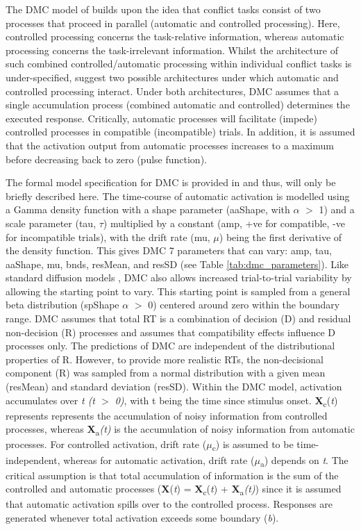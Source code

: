The DMC model of \textcite{ulrich2015automatic} builds upon the idea that
conflict tasks consist of two processes that proceed in parallel (automatic and
controlled processing). Here, controlled processing concerns the task-relative
information, whereas automatic processing concerns the task-irrelevant
information. Whilst the architecture of such combined controlled/automatic
processing within individual conflict tasks is under-specified,
\textcite{ulrich2015automatic} suggest two possible architectures
\parencite[see Figure 1 in ][]{ulrich2015automatic} under which automatic and
controlled processing interact. Under both architectures, DMC assumes that a
single accumulation process (combined automatic and controlled) determines the
executed response. Critically, automatic processes will facilitate (impede)
controlled processes in compatible (incompatible) trials. In addition, it is
assumed that the activation output from automatic processes increases to a
maximum before decreasing back to zero (pulse function).

The formal model specification for DMC is provided in
\textcite{ulrich2015automatic} and thus, will only be briefly described here.
The time-course of automatic activation is modelled using a Gamma density
function with a shape parameter (aaShape, with $\alpha$ $>$ 1) and a scale
parameter (tau, $\tau$) multiplied by a constant (amp, +ve for compatible, -ve
for incompatible trials), with the drift rate (mu, $\mu$) being the first
derivative of the density function. This gives DMC 7 parameters that can vary:
amp, tau, aaShape, mu, bnds, resMean, and resSD (see Table \ref{tab:dmc_parameters}).
Like standard diffusion models \parencite[see][]{ratcliff2013parameter}, DMC
also allows increased trial-to-trial variability by allowing the starting point
to vary. This starting point is sampled from a general beta distribution
(spShape $\alpha$ $>$ 0) centered around zero within the boundary range. DMC
assumes that total RT is a combination of decision (D) and residual
non-decision (R) processes and assumes that compatibility effects influence D
processes only. The predictions of DMC are independent of the distributional
properties of R. However, to provide more realistic RTs, the non-decisional
component (R) was sampled from a normal distribution with a given mean
(resMean) and standard deviation (resSD). Within the DMC model, activation
accumulates over \textit{t (t $>$ 0)}, with t being the time since stimulus
onset. \textbf{X}\textsubscript{c}(\textit{t}) represents represents the
accumulation of noisy information from controlled processes, whereas
\textbf{X}\textsubscript{a}\textit{(t)} is the accumulation of noisy
information from automatic processes. For controlled activation, drift rate
(\textit{$\mu$}\textsubscript{c}) is assumed to be time-independent, whereas
for automatic activation, drift rate (\textit{$\mu$}\textsubscript{a}) depends
on \textit{t}. The critical assumption is that total accumulation of
information is the sum of the controlled and automatic processes
(\textbf{X}(\textit{t}) = \textbf{X}\textsubscript{c}(\textit{t}) +
\textbf{X}\textsubscript{a}\textit{(t)}) since it is assumed that automatic
activation spills over to the controlled process. Responses are generated
whenever total activation exceeds some boundary (\textit{b}). 

